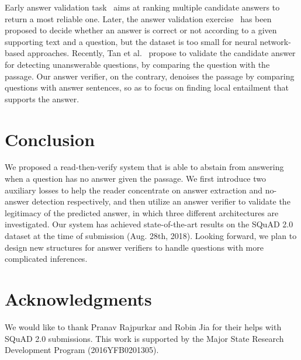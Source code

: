 \documentclass[letterpaper]{article} \usepackage{aaai19}  \usepackage{times}  \usepackage{helvet}  \usepackage{courier}  \usepackage{url}  \usepackage{graphicx}  \usepackage{pbox}
\begin{document}
Early answer validation task~\cite{magnini2002right} aims at ranking multiple candidate answers to return a most reliable one.
Later, the answer validation exercise~\cite{rodrigo2008overview} has been proposed to decide whether an answer is correct or not according to a given supporting text and a question, but the dataset is too small for neural network-based approaches. 
Recently, Tan et al.~ propose to validate the candidate answer for detecting unanswerable questions, by comparing the question with the passage.
Our answer verifier, on the contrary, denoises the passage by comparing questions with answer sentences, so as to focus on finding local entailment that supports the answer.  \section{Conclusion}
We proposed a read-then-verify system that is able to abstain from answering when a question has no answer given the passage.
We first introduce two auxiliary losses to help the reader concentrate on answer extraction and no-answer detection respectively, and then utilize an answer verifier to validate the legitimacy of the predicted answer, in which three different architectures are investigated.
Our system has achieved state-of-the-art results on the SQuAD 2.0 dataset at the time of submission (Aug. 28th, 2018).
Looking forward, we plan to design new structures for answer verifiers to handle questions with more complicated inferences.

\section*{Acknowledgments}
We would like to thank Pranav Rajpurkar and Robin Jia for their helps with SQuAD 2.0 submissions. This work is supported by the Major State Research Development Program (2016YFB0201305). 


\end{document}
